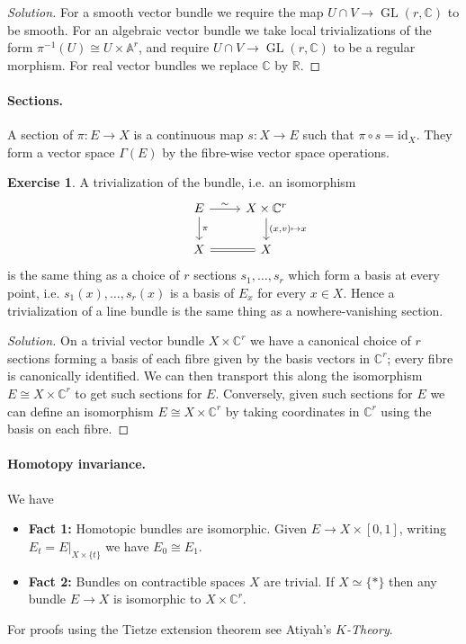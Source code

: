 \documentclass{article}
\theoremstyle{definition}
\newtheorem*{exercise}{Exercise}
\DeclareMathOperator{\GL}{GL}
\newcommand{\id}{\mathrm{id}}
\newcommand{\A}{\mathbb{A}}
\newcommand{\R}{\mathbb{R}}
\newcommand{\C}{\mathbb{C}}
\begin{document}
\begin{proof}[Solution]
    For a smooth vector bundle we require the map $U\cap V\to\GL(r,\C)$ to be
    smooth. For an algebraic vector bundle we take local trivializations of the
    form $\pi^{-1}(U)\cong U\times\A^r$, and require $U\cap V\to\GL(r,\C)$ to be
    a regular morphism. For real vector bundles we replace $\C$ by $\R$.
\end{proof}

\paragraph{Sections.} A section of $\pi:E\to X$ is a continuous map $s:X\to E$
such that $\pi\circ s=\id_X$. They form a vector space $\Gamma(E)$ by the
fibre-wise vector space operations.

\begin{exercise}
    A trivialization of the bundle, i.e. an isomorphism
    \begin{equation*}
        \begin{tikzcd}
            &E \ar[d,"\pi"] \ar[r,"\sim"]
                &X\times\C^r \ar[d,"{(x,v)\mapsto x}"] \\
            &X \ar[r,equals] &X
        \end{tikzcd}
    \end{equation*}
    is the same thing as a choice of $r$ sections $s_1,\ldots,s_r$ which form a
    basis at every point, i.e. $s_1(x),\ldots,s_r(x)$ is a basis of $E_x$ for
    every $x\in X$. Hence a trivialization of a line bundle is the same thing as
    a nowhere-vanishing section.
\end{exercise}

\begin{proof}[Solution]
    On a trivial vector bundle $X\times\C^r$ we have a canonical choice of $r$
    sections forming a basis of each fibre given by the basis vectors in $\C^r$;
    every fibre is canonically identified. We can then transport this along the
    isomorphism $E\cong X\times\C^r$ to get such sections for $E$. Conversely,
    given such sections for $E$ we can define an isomorphism
    $E\cong X\times\C^r$ by taking coordinates in $\C^r$ using the basis on each
    fibre.
\end{proof}

\paragraph{Homotopy invariance.} We have
\begin{itemize}
    \item \textbf{Fact 1:} Homotopic bundles are isomorphic. Given
        $E\to X\times[0,1]$, writing $E_t=E|_{X\times\{t\}}$ we have
        $E_0\cong E_1$.

    \item \textbf{Fact 2:} Bundles on contractible spaces $X$ are trivial. If
        $X\simeq\{*\}$ then any bundle $E\to X$ is isomorphic to $X\times\C^r$.
\end{itemize}
For proofs using the Tietze extension theorem see Atiyah's \emph{$K$-Theory}.
\end{document}
